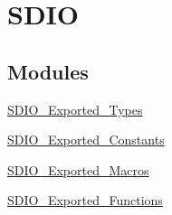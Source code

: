 \hypertarget{group__SDIO}{
\section{SDIO}
\label{group__SDIO}
}
\subsection*{Modules}
\begin{DoxyCompactItemize}
\item 
\hyperlink{group__SDIO__Exported__Types}{SDIO\_\-Exported\_\-Types}
\item 
\hyperlink{group__SDIO__Exported__Constants}{SDIO\_\-Exported\_\-Constants}
\item 
\hyperlink{group__SDIO__Exported__Macros}{SDIO\_\-Exported\_\-Macros}
\item 
\hyperlink{group__SDIO__Exported__Functions}{SDIO\_\-Exported\_\-Functions}
\end{DoxyCompactItemize}
